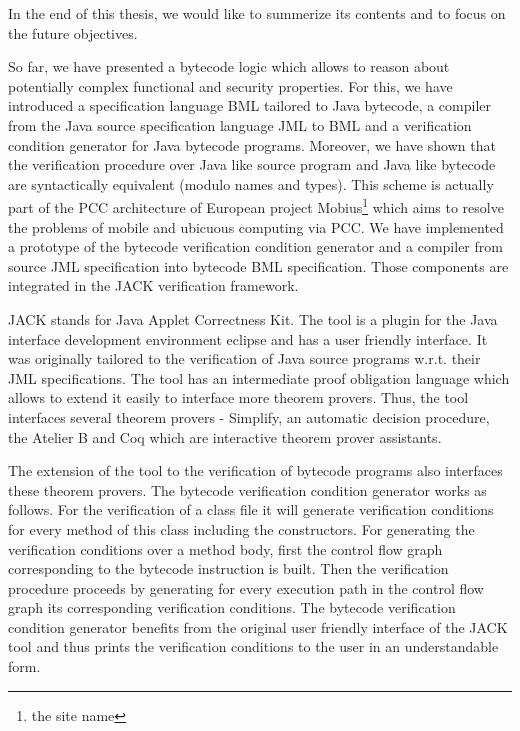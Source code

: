 
In the end of this thesis, we would like to summerize 
its contents and to focus on the future objectives. 

So far, we have  presented a bytecode logic which allows to reason about potentially
complex  functional and security properties.
 For this, we have 
introduced a specification language BML tailored to Java bytecode, a compiler
from the Java source specification language JML to BML and a verification 
condition generator for Java bytecode programs. Moreover, we have
shown that the verification procedure over Java like source program
and Java like bytecode are syntactically equivalent (modulo names and types). 
This scheme is actually part of the PCC architecture of 
European project Mobius\footnote{the site name} which aims to resolve the problems
of mobile and ubicuous computing via PCC. 
We have implemented a prototype of the bytecode verification condition generator and a compiler 
from source JML specification into bytecode BML specification. Those components are integrated in the JACK verification framework. 

JACK stands for Java Applet Correctness Kit. The tool is a plugin for the Java interface development
 environment eclipse and has a user friendly interface. It was originally tailored to the verification of Java source programs 
w.r.t. their JML specifications. The tool has an intermediate proof obligation language which allows to extend it easily to interface more 
 theorem provers. Thus, the tool interfaces several theorem provers -
 Simplify,  an automatic decision procedure, the Atelier B and  Coq which are 
 interactive theorem prover assistants. 


The extension of the tool to  the verification of bytecode programs also interfaces these theorem provers. The bytecode 
verification condition generator works as follows. For the verification of a class file it will generate verification conditions for every
 method of this class including the constructors. For generating the verification conditions over a method body, first the control flow
 graph corresponding to the bytecode instruction is built.
 Then the verification procedure proceeds by generating for every execution path in the control flow graph its corresponding verification conditions.
The bytecode verification condition generator benefits from the original user
friendly interface of the JACK tool and thus prints the verification conditions
to the user in an understandable form. 

